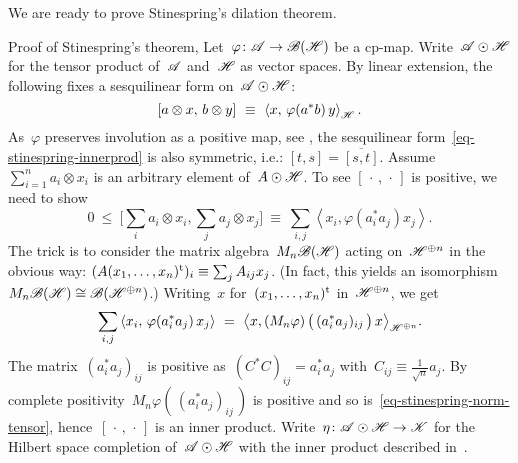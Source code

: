 \documentclass[b]{subfiles}
\begin{document}
\begin{parsec}%
\begin{point}%
We are ready to prove Stinespring's dilation theorem.
\begin{point}{%
    Proof of Stinespring's theorem, }%
Let~$\varphi\colon \mathscr{A} \to \mathscr{B}(\mathscr{H})$
    be a cp-map.
Write~$\mathscr{A} \odot \mathscr{H}$ for the tensor product of~$\mathscr{A}$ and~$\mathscr{H}$
    as vector spaces.
By linear extension,
the following fixes a sesquilinear form on~$\mathscr{A} \odot \mathscr{H}$:
\begin{equation}\label{eq-stinespring-innerprod}
    [a\otimes x,\, b \otimes y] \ \equiv\  \left<x, \,\varphi(a^*b)\, y\right>_{\mathscr{H}}.
\end{equation}
As~$\varphi$ preserves involution as a positive map,
see ,
the sesquilinear form~\eqref{eq-stinespring-innerprod}
is also symmetric, i.e.: $[t,s]=\overline{[s,t]}$.
    Assume~$\sum^n_{i=1} a_i\otimes x_i$
is an arbitrary element of~$A \odot \mathscr{H}$.
To see $[\,\cdot\,,\,\cdot\,]$ is positive,
we need to show
\begin{equation*}
    0 \ \leq\  \bigl[\sum_i a_i\otimes x_i, \sum_j a_j\otimes x_j\bigr]
        \ \equiv\  \sum_{i,j} \left< x_i, \varphi(a_i^*a_j) x_j \right>.
\end{equation*}
The trick is to consider the matrix algebra~$M_n\mathscr{B}(\mathscr{H})$
acting on~$\mathscr{H}^{\oplus n}$ in the obvious way:
$(A (x_1,\ldots,x_n)^{\mathrm{t}})_i \equiv \sum_j A_{ij} x_j$.
(In fact, this yields an
    isomorphism~$M_n\mathscr{B}(\mathscr{H}) \cong \mathscr{B}(\mathscr{H}^{\oplus n})$.)
Writing~$x$ for~$(x_1,\ldots,x_n)^{\mathrm{t}}$ in~$\mathscr{H}^{\oplus n}$,
    we get
\begin{equation}\label{eq-stinespring-norm-tensor}
    \sum_{i,j} \left< x_i, \,\varphi(a_i^*a_j)\, x_j \right>
    \ =\  \bigl<
    x,
    (M_n\varphi) \,\bigl(\, (a_i^*a_j)_{ij} \, \bigr)\,
    x \bigr>_{\mathscr{H}^{\oplus n}}.
\end{equation}
The matrix~$(a_i^*a_j)_{ij}$
is positive as~$(C^*C)_{ij} = a_i^*a_j$
    with~$C_{ij} \equiv \frac{1}{\sqrt{n}} a_j$.
    By complete positivity~$M_n\varphi(\,(a_i^*a_j)_{ij}\,)$ is positive
    and so is~\eqref{eq-stinespring-norm-tensor},
    hence~$[\,\cdot\,,\,\cdot\,]$ is an inner product.
Write~$\eta\colon \mathscr{A}\odot \mathscr{H} \to \mathscr{K}$ for the Hilbert space completion
    of~$\mathscr{A} \odot \mathscr{H}$ with the inner product
    described in~.
\begin{point}%

\end{point}
\end{point}
\end{point}
\end{parsec}
\end{document}
